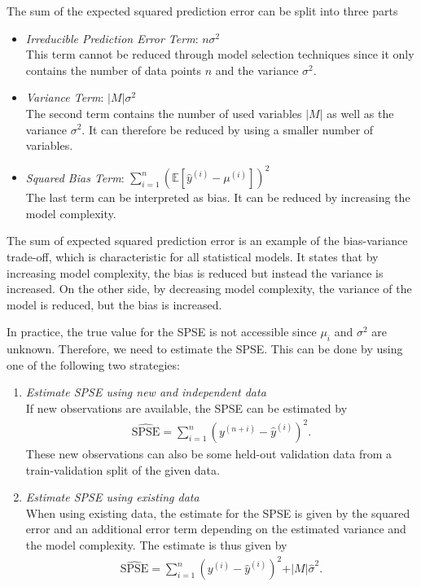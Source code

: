 \documentclass[10pt,a4paper]{article}
\begin{document}
The sum of the expected squared prediction error can be split into three parts

\begin{itemize}
	\item \emph{Irreducible Prediction Error Term}: $n\sigma^2$ \\
	This term cannot be reduced through model selection techniques since it only contains the number of data points $n$ and the variance $\sigma^2$.

	\item \emph{Variance Term}: $\vert M \vert \sigma^2$ \\
	The second term contains the number of used variables $\vert M \vert$ as well as the variance $\sigma^2$. It can therefore be reduced by using a smaller number of variables.
	
	\item \emph{Squared Bias Term}: $\sum_{i=1}^{n} (\mathbb{E}[\hat y^{(i)} - \mu^{(i)}])^2$\\
	The last term can be interpreted as bias. It can be reduced by increasing the model complexity.
\end{itemize}

The sum of expected squared prediction error is an example of the bias-variance trade-off, which is characteristic for all statistical models. It states that by increasing model complexity, the bias is reduced but instead the variance is increased. On the other side, by decreasing model complexity, the variance of the model is reduced, but the bias is increased. \cite{bishop2006patternRecognition}


In practice, the true value for the SPSE is not accessible since $\mu_i$ and $\sigma^2$ are unknown. Therefore, we need to estimate the SPSE. This can be done by using one of the following two strategies:

\begin{enumerate}

	\item \emph{Estimate SPSE using new and independent data} \\	
	If new observations are available, the SPSE can be estimated by
	\begin{align}
		\widehat{\text{SPSE}} = \sum_{i=1}^n (y^{(n+i)} - \hat y^{(i)})^2.
	\end{align}
	These new observations can also be some held-out validation data from a train-validation split of the given data. 
	
	\item \emph{Estimate SPSE using existing data} \\
	When using existing data, the estimate for the SPSE is given by the squared error and an additional error term depending on the estimated variance and the model complexity. The estimate is thus given by
	\begin{align}
		\widehat{\text{SPSE}} = \sum_{i=1}^n(y^{(i)} - \hat y^{(i)})^2 + \vert M \vert \hat \sigma^2.
	\end{align}

\end{enumerate}
\end{document}
